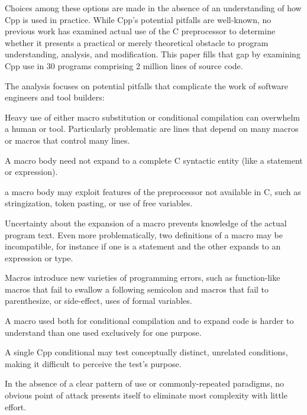 \documentclass[10pt]{article}
\def\numpackages{30}
\def\numlines{2 million}
\begin{document}
Choices among these options are made in the absence of
an understanding of how Cpp is used in practice.
While  Cpp's potential pitfalls are well-known, no
previous work has examined actual use of the C preprocessor to
determine whether it presents a practical or merely theoretical
obstacle to program understanding, analysis, and modification.  This
paper fills that gap by examining Cpp use in {\numpackages} programs
comprising {\numlines} lines of source code.

The analysis focuses on potential pitfalls that complicate the work of
software engineers and tool builders:
\begin{description}\itemsep 0pt \parskip 0pt
\item[high total use]  Heavy use of either macro substitution or
  conditional compilation can overwhelm a human or tool.  Particularly
  problematic are lines that depend on many macros or macros that control
  many lines.
\item[complicated bodies]  A macro body need not expand to a complete
  C syntactic entity (like a statement or expression).
\item[extra-linguistic features]  a macro body may exploit features of
  the preprocessor not available in C, such as stringization, token
  pasting, or use of free variables.
\item[multiple definitions]  Uncertainty about the expansion of a macro
  prevents knowledge of the actual program text.  Even more problematically,
  two definitions of a macro may be incompatible, for instance if one is a
  statement and the other expands to an expression or type.
\item[macro pitfalls]  Macros introduce new varieties of programming
  errors, such as function-like macros that fail to swallow a following
  semicolon and macros that fail to parenthesize, or side-effect, uses of
  formal variables.
\item[inconsistent usage]  A macro used both for conditional compilation
  and to expand code is harder to understand than one used exclusively for one
  purpose.
\item[mixed tests]  A single Cpp conditional may test conceptually
  distinct, unrelated conditions, making it difficult to perceive the
  test's purpose.
\item[variation in use]  In the absence of a clear pattern of use or
  commonly-repeated paradigms, no obvious point of attack presents itself
  to eliminate most complexity with little effort.
\end{description}
\end{document}
